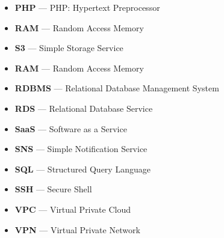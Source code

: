 \begin{itemize}
    \item  \textbf{PHP} — PHP: Hypertext Preprocessor
    \item  \textbf{RAM} — Random Access Memory
    \item  \textbf{S3} — Simple Storage Service
    \item  \textbf{RAM} — Random Access Memory
    \item  \textbf{RDBMS} — Relational Database Management System
    \item  \textbf{RDS} — Relational Database Service
    \item  \textbf{SaaS} — Software as a Service
    \item  \textbf{SNS} — Simple Notification Service
    \item  \textbf{SQL} — Structured Query Language
    \item  \textbf{SSH} — Secure Shell
    \item  \textbf{VPC} — Virtual Private Cloud
    \item  \textbf{VPN} — Virtual Private Network
\end{itemize}